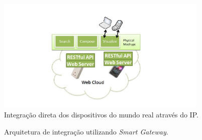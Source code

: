 \documentclass[12pt,a4paper,oneside]{report}
\begin{document}
\begin{figure}[h!]
   \centering
    \includegraphics[width=0.9\textwidth]{figuras/figura_2_4}
    \caption{Integração direta dos dispositivos do mundo real através do IP.}
    \label{http-embarcado}
\end{figure}
\begin{figure}[h!]
   \centering
   \caption{Arquitetura de integração utilizando \emph{Smart Gateway}.}
    \label{http-centralizado}
\end{figure}

\end{document}

